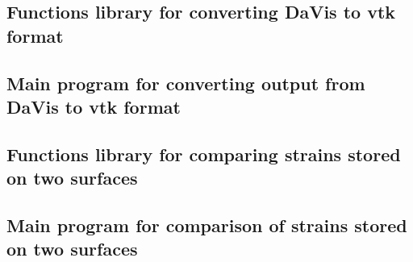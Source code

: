 

\subsection{Functions library for converting DaVis to \acs*{vtk} format}
\label{sec:code_dic_dic_convertLib}
		

\subsection{Main program for converting output from DaVis to \acs*{vtk} format}
\label{sec:code_dic_dic_convert}


\subsection{Functions library for comparing strains stored on two surfaces}
\label{sec:code_dic_dic_lib}


\subsection{Main program for comparison of strains stored on two surfaces}
\label{sec:code_dic_dic_main}

